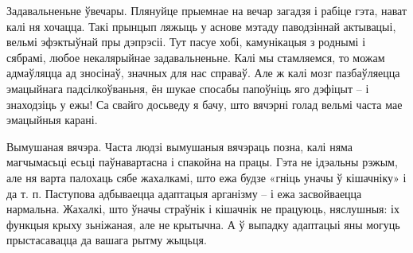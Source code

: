 Задавальненьне ўвечары.
Плянуйце прыемнае на вечар загадзя і рабіце гэта, нават калі ня хочацца. Такі прынцып ляжыць у аснове мэтаду паводзіннай актывацыі, вельмі эфэктыўнай пры дэпрэсіі. Тут пасуе хобі, камунікацыя з роднымі і сябрамі, любое некалярыйнае задавальненьне. Калі мы стамляемся, то можам адмаўляцца ад зносінаў, значных для нас справаў. Але ж калі мозг пазбаўляецца эмацыйнага падсілкоўваньня, ён шукае спосабы папоўніць яго дэфіцыт – і знаходзіць у ежы! Са свайго досьведу я бачу, што вячэрні голад вельмі часта мае эмацыйныя карані.

Вымушаная вячэра.
Часта людзі вымушаныя вячэраць позна, калі няма магчымасьці есьці паўнавартасна і спакойна на працы. Гэта не ідэальны рэжым, але ня варта палохаць сябе жахалкамі, што ежа будзе «гніць уначы ў кішачніку» і да т. п. Паступова адбываецца адаптацыя арганізму – і ежа засвойваецца нармальна. Жахалкі, што ўначы страўнік і кішачнік не працуюць, няслушныя: іх функцыя крыху зьніжаная, але не крытычна. А ў выпадку адаптацыі яны могуць прыстасавацца да вашага рытму жыцьця.
